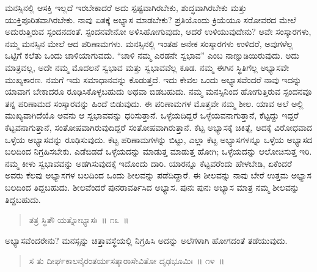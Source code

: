 ಮನಸ್ಸಿನಲ್ಲಿ ಆಸಕ್ತಿ ಇಲ್ಲದೆ ಇರಬೇಕಾದರೆ ಅದು ಸ್ಪಷ್ಟವಾಗಿರಬೇಕು, ಶುದ್ಧವಾಗಿರಬೇಕು ಮತ್ತು ಯುಕ್ತಿಪೂರಿತವಾಗಿರಬೇಕು. ನಾವು ಏತಕ್ಕೆ ಅಭ್ಯಾಸ ಮಾಡಬೇಕು? ಪ್ರತಿಯೊಂದು ಕ್ರಿಯೆಯೂ ಸರೋವರದ ಮೇಲೆ ಅದುರುತ್ತಿರುವ ಸ್ಪಂದನದಂತೆ. ಸ್ಪಂದನವೇನೋ ಅಳಿಸಿಹೋಗುವುದು, ಆದರೆ ಉಳಿಯುವುದೇನು? ಅವೇ ಸಂಸ್ಕಾರಗಳು, ನಮ್ಮ ಮನಸ್ಸಿನ ಮೇಲೆ ಆದ ಪರಿಣಾಮಗಳು. ಮನಸ್ಸಿನಲ್ಲಿ ಇಂತಹ ಅನೇಕ ಸಂಸ್ಕಾರಗಳು ಉಳಿದರೆ, ಅವುಗಳೆಲ್ಲ ಒಟ್ಟಿಗೆ ಕಲೆತು ಒಂದು ಚಾಳಿಯಾಗುವದು. “ಚಾಳಿ ನಮ್ಮ ಎರಡನೇ ಸ್ವಭಾವ” ಎಂಬ ನಾಣ್ನುಡಿಯಿರುವುದು. ಅದು ಮಾತ್ರವಲ್ಲ, ಅದೇ ನಮ್ಮ ಮೊದಲನೆ ಸ್ವಭಾವ ಮತ್ತು ಸ್ವಭಾವವೆಲ್ಲ ಕೂಡ. ನಮ್ಮ ಈಗಿನ ಸ್ಥಿತಿಗೆಲ್ಲ ಅಭ್ಯಾಸವೇ ಮುಖ್ಯಕಾರಣ. ನಮಗೆ ಇದು ಸಮಾಧಾನವನ್ನು ಕೊಡುತ್ತದೆ. ಇದು ಕೇವಲ ಒಂದು ಅಭ್ಯಾಸವೆಂದರೆ ನಾವು ಇದನ್ನು ಯಾವಾಗ ಬೇಕಾದರೂ ರೂಢಿಸಿಕೊಳ್ಳಬಹುದು ಅಥವಾ ಬಿಡಬಹುದು. ನಮ್ಮ ಮನಸ್ಸಿನಿಂದ ಹೋಗುತ್ತಿರುವ ಸ್ಪಂದನವೂ ತನ್ನ ಪರಿಣಾಮದ ಸಂಸ್ಕಾರವನ್ನು ಹಿಂದೆ ಬಿಡುವುದು. ಈ ಪರಿಣಾಮಗಳ ಮೊತ್ತವೇ ನಮ್ಮ ಶೀಲ. ಯಾವ ಅಲೆ ಅಲ್ಲಿ ಮುಖ್ಯವಾಗಿದೆಯೊ ಅವನು ಆ ಸ್ವಭಾವವನ್ನು ಧರಿಸುತ್ತಾನೆ. ಒಳ್ಳೆಯದಿದ್ದರೆ ಒಳ್ಳೆಯವನಾಗುತ್ತಾನೆ, ಕೆಟ್ಟದ್ದು ಇದ್ದರೆ ಕೆಟ್ಟವನಾಗುತ್ತಾನೆ, ಸಂತೋಷವಾಗಿರುವುದಿದ್ದರೆ ಸಂತೋಷವಾಗಿರುತ್ತಾನೆ. ಕೆಟ್ಟ ಅಭ್ಯಾಸಕ್ಕೆ ಚಿಕಿತ್ಸೆ, ಅದಕ್ಕೆ ವಿರೋಧವಾದ ಒಳ್ಳೆಯ ಅಭ್ಯಾಸವನ್ನು ರೂಢಿಸುವುದು. ಕೆಟ್ಟ ಪರಿಣಾಮಗಳನ್ನು ಬಿಟ್ಟು, ಎಲ್ಲಾ ಕೆಟ್ಟ ಅಭ್ಯಾಸಗಳನ್ನೂ ಒಳ್ಳೆಯ ಅಭ್ಯಾಸದ ಬಲದಿಂದ ನಿಗ್ರಹಿಸಬೇಕು. ಎಡೆಬಿಡದೆ ಒಳ್ಳೆಯದನ್ನು ಮಾಡುತ್ತ ಮಾಡುತ್ತ ಹೋಗಿ; ಒಳ್ಳೆಯದನ್ನು ಆಲೋಚಿಸುತ್ತ ಇರಿ. ನಮ್ಮ ಕೀಳು ಸ್ವಭಾವವನ್ನು ಅಡಗಿಸುವುದಕ್ಕೆ ಇದೊಂದು ದಾರಿ. ಯಾರನ್ನೂ ಕೆಟ್ಟವರೆಂದು ಹೇಳಬೇಡಿ, ಏಕೆಂದರೆ ಅವರು ಕೆಲವು ಅಭ್ಯಾಸಗಳ ಬಲದಿಂದ ಒಂದು ಶೀಲವನ್ನು ಪಡೆದಿದ್ದಾರೆ. ಈ ಶೀಲವನ್ನು ನಾವು ಬೇರೆ ಉತ್ತಮ ಅಭ್ಯಾಸ ಬಲದಿಂದ ತಿದ್ದಬಹುದು. ಶೀಲವೆಂದರೆ ಪುನರಾವರ್ತಿಸಿದ ಅಭ್ಯಾಸ. ಪುನಃ ಪುನಃ ಅಭ್ಯಾಸ ಮಾತ್ರ ನಮ್ಮ ಶೀಲವನ್ನು ತಿದ್ದಬಹುದು. 

\vspace{-0.2cm}

\begin{verse}
ತತ್ರ ಸ್ಥಿತೌ ಯತ್ನೋಭ್ಯಾಸಃ~॥ ೧೩~॥
\end{verse}

\vspace{-0.4cm}


\vspace{0.1cm}

ಅಭ್ಯಾಸವೆಂದರೇನು? ಮನಸ್ಸನ್ನು ಚಿತ್ತಾವಸ್ಥೆಯಲ್ಲಿ ನಿಗ್ರಹಿಸಿ ಅದನ್ನು ಅಲೆಗಳಾಗಿ ಹೋಗದಂತೆ ತಡೆಯುವುದು. 

\vspace{-0.2cm}

\begin{verse}
ಸ ತು ದೀರ್ಘಕಾಲನೈರಂತರ್ಯಸತ್ಕಾರಾಸೇವಿತೋ ದೃಢಭೂಮಿಃ~॥ ೧೪~॥
\end{verse}

\vspace{-0.4cm}


